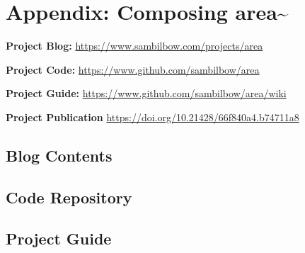 \chapter{Appendix: Composing area\textasciitilde{}}

\noindent \textbf{Project Blog:}        \url{https://www.sambilbow.com/projects/area}

\noindent \textbf{Project Code:}        \url{https://www.github.com/sambilbow/area}

\noindent \textbf{Project Guide:}       \url{https://www.github.com/sambilbow/area/wiki}

\noindent \textbf{Project Publication } \url{https://doi.org/10.21428/66f840a4.b74711a8}

\section{Blog Contents}
\section{Code Repository}
\section{Project Guide}